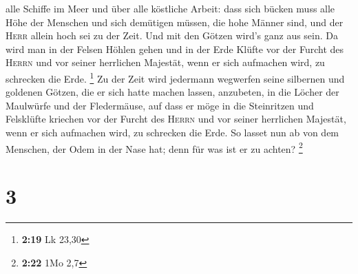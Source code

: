 alle Schiffe im Meer und über alle köstliche Arbeit: 
dass sich bücken muss alle Höhe der Menschen und sich demütigen müssen,
die hohe Männer sind, und der \textsc{Herr} allein hoch sei zu der Zeit.
 Und mit den Götzen wird's ganz aus sein. 
Da wird man in der Felsen Höhlen gehen und in der Erde Klüfte vor der
Furcht des \textsc{Herrn} und vor seiner herrlichen Majestät, wenn er
sich aufmachen wird, zu schrecken die Erde. \footnote{\textbf{2:19} Lk
  23,30}  Zu der Zeit wird jedermann wegwerfen seine
silbernen und goldenen Götzen, die er sich hatte machen lassen,
anzubeten, in die Löcher der Maulwürfe und der Fledermäuse,
 auf dass er möge in die Steinritzen und Felsklüfte
kriechen vor der Furcht des \textsc{Herrn} und vor seiner herrlichen
Majestät, wenn er sich aufmachen wird, zu schrecken die Erde.
 So lasset nun ab von dem Menschen, der Odem in der Nase
hat; denn für was ist er zu achten? \footnote{\textbf{2:22} 1Mo 2,7}

\hypertarget{section-1}{%
\section{3}\label{section-1}}

